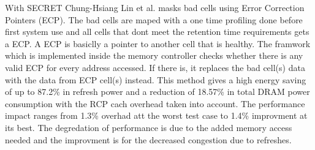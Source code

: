 With SECRET Chung-Hsiang Lin et al. \cite{secret} masks bad cells using Error Correction Pointers (ECP). The bad cells are maped with a one time profiling done before first system use and all cells that dont meet the retention time requirements gets a ECP. A ECP is basiclly a pointer to another cell that is healthy. The framwork which is implemented inside the memory controller checks whether there is any valid ECP for every address accessed. If there is, it replaces the bad cell(s) data with the data from ECP cell(s) instead.
This method gives a high energy saving of up to 87.2\% in refresh power and a reduction of 18.57\% in total DRAM power consumption with the RCP cach overhead taken into account.
The performance impact ranges from 1.3\% overhad att the worst test case to 1.4\% improvment at its best. The degredation of performance is due to the added memory access needed and the improvment is for the decreased congestion due to refreshes.